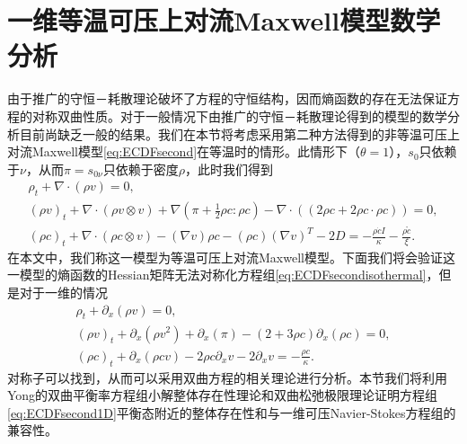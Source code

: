 \section{一维等温可压上对流Maxwell模型数学分析}
由于推广的守恒－耗散理论破坏了方程的守恒结构，因而熵函数的存在无法保证方程的对称双曲性质。对于一般情况下由推广的守恒－耗散理论得到的模型的数学分析目前尚缺乏一般的结果。我们在本节将考虑采用第二种方法得到的非等温可压上对流Maxwell模型\eqref{eq:ECDFsecond}在等温时的情形。此情形下（$\theta=1$），$s_0$只依赖于$\nu$，从而$\pi = s_{0\nu}$只依赖于密度$\rho$，此时我们得到
	\begin{subequations} \label{eq:ECDFsecondisothermal}
		\begin{align}
			\rho_t + \nabla \cdot (\rho v) = 0 ,\\
			(\rho v)_t + \nabla \cdot (\rho v \otimes v) + \nabla (\pi + \frac{1}{2} \rho c: \rho c)  - \nabla \cdot ( (2 \rho c + 2 \rho c \cdot \rho c)) =0 ,\\
			(\rho c)_t +  \nabla \cdot (\rho c \otimes v) - (\nabla v) \rho c - (\rho c) (\nabla v)^T - 2 D = - \frac{\rho \dot{c}I}{\kappa} -  \frac{\rho \mathring{c}}{\xi}  .
		\end{align}
	\end{subequations}
	在本文中，我们称这一模型为等温可压上对流Maxwell模型。下面我们将会验证这一模型的熵函数的Hessian矩阵无法对称化方程组\eqref{eq:ECDFsecondisothermal}，但是对于一维的情况
\begin{subequations} \label{eq:ECDFsecond1D}
		\begin{align}
			\rho_t + \partial_x (\rho v) = 0 ,\\
			(\rho v)_t + \partial_x (\rho v^2) + \partial_x (\pi)   -  (2+ 3 \rho c) \partial_x (  \rho c) =0 ,\\
			(\rho c)_t +  \partial_x (\rho c  v) - 2 \rho c \partial_x  v  - 2 \partial_x v = - \frac{\rho {c}}{\kappa}  .
		\end{align}
\end{subequations}
对称子可以找到，从而可以采用双曲方程的相关理论进行分析。本节我们将利用Yong的双曲平衡率方程组小解整体存在性理论和双曲松弛极限理论证明方程组\eqref{eq:ECDFsecond1D}平衡态附近的整体存在性和与一维可压Navier-Stokes方程组的兼容性。

